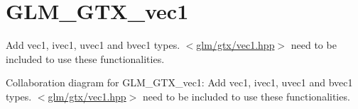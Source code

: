 \hypertarget{group__gtx__vec1}{}\section{G\+L\+M\+\_\+\+G\+T\+X\+\_\+vec1}
\label{group__gtx__vec1}


Add vec1, ivec1, uvec1 and bvec1 types. $<$\hyperlink{vec1_8hpp}{glm/gtx/vec1.\+hpp}$>$ need to be included to use these functionalities.  


Collaboration diagram for G\+L\+M\+\_\+\+G\+T\+X\+\_\+vec1\+:
Add vec1, ivec1, uvec1 and bvec1 types. $<$\hyperlink{vec1_8hpp}{glm/gtx/vec1.\+hpp}$>$ need to be included to use these functionalities. 

